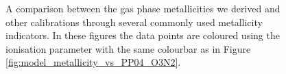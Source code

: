 \documentclass[fleqn,usenatbib]{mnras}
\begin{document}
\begin{figure}
    \caption{A comparison between the gas phase metallicities we derived and other calibrations through several commonly used metallicity indicators. In these figures the data points are coloured using the ionisation parameter with the same colourbar as in Figure \ref{fig:model_metallicity_vs_PP04_O3N2}.}
    \label{fig:metallicity_indicator_comparison}
\end{figure}



\bsp	%
\label{lastpage}
\end{document}

